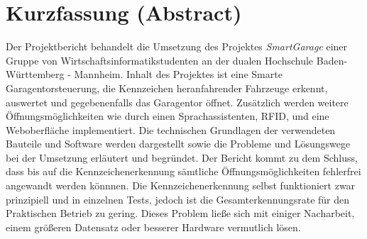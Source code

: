 \chapter*{Kurzfassung (Abstract)}

Der Projektbericht behandelt die Umsetzung des Projektes \textit{SmartGarage} einer Gruppe von Wirtschaftsinformatikstudenten an der dualen Hochschule Baden-Württemberg - Mannheim.
Inhalt des Projektes ist eine Smarte Garagentorsteuerung, die Kennzeichen heranfahrender Fahrzeuge erkennt, auswertet und gegebenenfalls das Garagentor öffnet. Zusätzlich werden weitere Öffnungsmöglichkeiten wie durch einen Sprachassistenten, RFID, und eine Weboberfläche implementiert. Die technischen Grundlagen der verwendeten Bauteile und Software werden dargestellt sowie die Probleme und Lösungswege bei der Umsetzung erläutert und begründet. \newline 
Der Bericht kommt zu dem Schluss, dass bis auf die Kennzeichenerkennung sämtliche Öffnungsmöglichkeiten fehlerfrei angewandt werden könnnen. Die Kennzeichenerkennung selbst funktioniert zwar prinzipiell und in einzelnen Tests, jedoch ist die Gesamterkennungsrate für den Praktischen Betrieb zu gering. Dieses Problem ließe sich mit einiger Nacharbeit, einem größeren Datensatz oder besserer Hardware vermutlich lösen.

